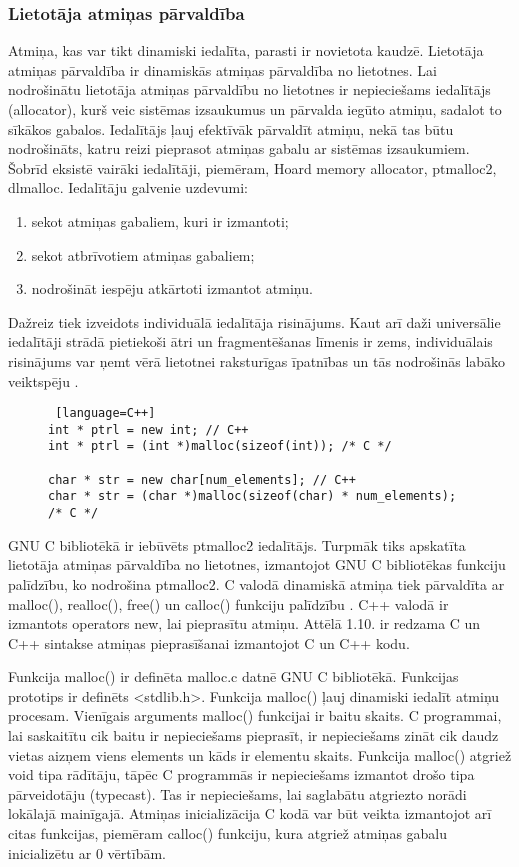 \subsubsection{Lietotāja atmiņas pārvaldība}
Atmiņa, kas var tikt dinamiski iedalīta, parasti ir novietota kaudzē. 
Lietotāja atmiņas pārvaldība ir dinamiskās atmiņas pārvaldība no lietotnes.
Lai nodrošinātu lietotāja atmiņas pārvaldību no lietotnes ir nepieciešams iedalītājs (allocator), kurš veic sistēmas izsaukumus un pārvalda iegūto atmiņu, sadalot to sīkākos gabalos.
Iedalītājs ļauj efektīvāk pārvaldīt atmiņu, nekā tas būtu nodrošināts, katru reizi pieprasot atmiņas gabalu ar sistēmas izsaukumiem.
Šobrīd eksistē vairāki iedalītāji, piemēram, Hoard memory allocator, ptmalloc2, dlmalloc.
Iedalītāju galvenie uzdevumi: 
\begin{enumerate}
\item sekot atmiņas gabaliem, kuri ir izmantoti;
\item sekot atbrīvotiem atmiņas gabaliem;
\item nodrošināt iespēju atkārtoti izmantot atmiņu.
\end{enumerate}
Dažreiz tiek izveidots individuālā iedalītāja risinājums. 
Kaut arī daži universālie iedalītāji strādā pietiekoši ātri un fragmentēšanas līmenis ir zems, individuālais risinājums var ņemt vērā lietotnei raksturīgas īpatnības un tās nodrošinās labāko veiktspēju \cite{EDBG}.
\begin{figure}[h]
\begin{lstlisting} [language=C++]
int * ptrl = new int; // C++
int * ptrl = (int *)malloc(sizeof(int)); /* C */

char * str = new char[num_elements]; // C++
char * str = (char *)malloc(sizeof(char) * num_elements); /* C */
\end{lstlisting}
\caption{\textbf{\fontsize{11}{12}\selectfont {Dinamiskās atmiņas iedalīšana C un C++}}}
\end{figure}

GNU C bibliotēkā ir iebūvēts ptmalloc2 iedalītājs.
Turpmāk tiks apskatīta lietotāja atmiņas pārvaldība no lietotnes, izmantojot GNU C bibliotēkas funkciju palīdzību, ko nodrošina ptmalloc2.
C valodā dinamiskā atmiņa tiek pārvaldīta ar malloc(), realloc(), free() un calloc() funkciju palīdzību \cite {PETRSOF}.
C++ valodā ir izmantots operators new, lai pieprasītu atmiņu. 
Attēlā 1.10. ir redzama C un C++ sintakse atmiņas pieprasīšanai izmantojot C un C++ kodu.


Funkcija malloc() ir definēta malloc.c datnē GNU C bibliotēkā. 
Funkcijas prototips ir definēts <stdlib.h>.
Funkcija malloc() ļauj dinamiski iedalīt atmiņu procesam.
Vienīgais arguments malloc() funkcijai ir baitu skaits.
C programmai, lai saskaitītu cik baitu ir nepieciešams pieprasīt, ir nepieciešams zināt cik daudz vietas aizņem viens elements un kāds ir elementu skaits.
Funkcija malloc() atgriež void tipa rādītāju, tāpēc C programmās ir nepieciešams izmantot drošo tipa pārveidotāju (typecast). 
Tas ir nepieciešams, lai saglabātu atgriezto norādi lokālajā mainīgajā. Atmiņas inicializācija C kodā
var būt veikta izmantojot arī citas funkcijas, piemēram calloc() funkciju, kura atgriež atmiņas gabalu inicializētu ar 0 vērtībām.

